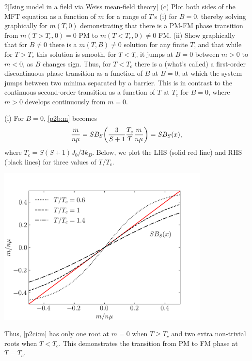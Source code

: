 \documentclass[12pt]{article}
\begin{document}
\begin{problem}{2}[Ising model in a field via Weiss mean-field theory]
(c) Plot both sides of the MFT equation as a function of $m$ for a range of
$T$'s (i) for $B=0$, thereby solving graphically for $m(T,0)$ demonstrating that
there is a PM-FM phase transition from $m(T>T_c,0)=0$ PM to $m(T<T_c,0)\neq 0$
FM. (ii) Show graphically that for $B\neq 0 $ there is a $m(T,B)\neq 0$ solution
for any finite $T$, and that while for $T>T_c$ this solution is smooth, for
$T<T_c$ it jumps at $B=0$ between $m>0$ to $m<0$, as $B$ changes sign. Thus, for
$T<T_c$ there is a (what's called) a first-order discontinuous phase transition
as a function of $B$ at $B=0$, at which the system jumps between two minima
separated by a barrier. This is in contrast to the continuous second-order
transition as a function of $T$ at $T_c$ for $B=0$, where $m>0$ develops
continuously from $m=0$.
\begin{solution}
(i) For $B=0$, \eqref{p2b:m} becomes
\begin{equation}\label{p2ci:m}
    \frac{m}{n\mu}=SB_S\qty(\frac{3}{S+1}\frac{T_c}{T}\frac{m}{n\mu})
    =SB_S(x), 
\end{equation}
where $T_c=S(S+1)J_0/3k_B$. Below, we plot the LHS (solid red line) and RHS 
(black lines) for three values of $T/T_c$.
\begin{center}
    \includegraphics[width=0.8\textwidth]{p2ci.png} 
\end{center}
Thus, \eqref{p2ci:m} has only one root at $m=0$ when $T\geq T_c$ and two extra
non-trivial roots when $T<T_c$. This demonstrates the transition from PM to FM
phase at $T=T_c$.


\end{solution}
\end{problem}
\end{document}
